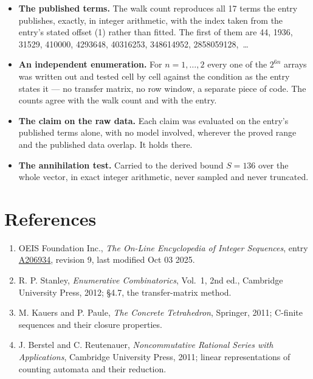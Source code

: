 \documentclass[11pt]{article}
\theoremstyle{definition}
\begin{document}
\begin{itemize}

\item {\bfseries The published terms.} The walk count reproduces all 17 terms the entry publishes, exactly, in integer arithmetic, with the index taken from the entry's stated offset (1) rather than fitted. The first of them are 44, 1936, 31529, 410000, 4293648, 40316253, 348614952, 2858059128,~\dots

\item {\bfseries An independent enumeration.} For $n = 1,\dots,2$ every one of the $2^{6n}$ arrays was written out and tested cell by cell against the condition as the entry states it --- no transfer matrix, no row window, a separate piece of code. The counts agree with the walk count and with the entry.

\item {\bfseries The claim on the raw data.} Each claim was evaluated on the entry's published terms alone, with no model involved, wherever the proved range and the published data overlap. It holds there.

\item {\bfseries The annihilation test.} Carried to the derived bound $S = 136$ over the whole vector, in exact integer arithmetic, never sampled and never truncated.

\end{itemize}

\section{References}

\begin{enumerate}

\item OEIS Foundation Inc., \emph{The On-Line Encyclopedia of Integer Sequences}, entry \href{https://oeis.org/A206934}{A206934}, revision 9, last modified Oct 03 2025.

\item R. P. Stanley, \emph{Enumerative Combinatorics}, Vol.~1, 2nd ed., Cambridge University Press, 2012; \S4.7, the transfer-matrix method.

\item M. Kauers and P. Paule, \emph{The Concrete Tetrahedron}, Springer, 2011; C-finite sequences and their closure properties.

\item J. Berstel and C. Reutenauer, \emph{Noncommutative Rational Series with Applications}, Cambridge University Press, 2011; linear representations of counting automata and their reduction.

\end{enumerate}
\end{document}
